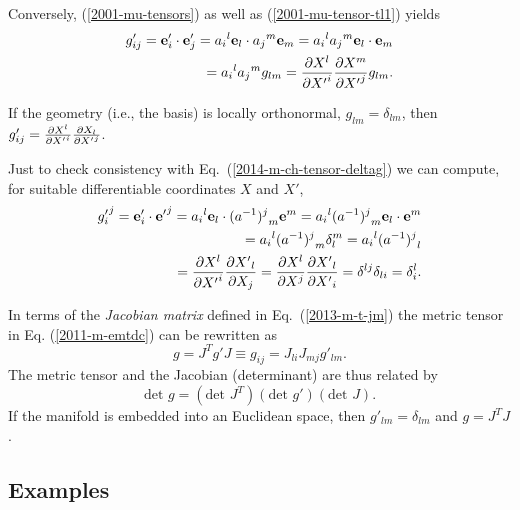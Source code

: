 Conversely,  (\ref{2001-mu-tensors}) as well as    (\ref{2001-mu-tensor-tl1})
yields
\begin{equation}
\begin{split}
g'_{ij}={\bf e}'_i\cdot {\bf e}'_j
={a_i}^l{\bf e}_l\cdot {a_j}^m{\bf e}_m
={a_i}^l {a_j}^m {\bf e}_l\cdot {\bf e}_m  \\
= {a_i}^l {a_j}^m {g}_{lm}
= {\partial {X}^l\over \partial {X'}^i}{\partial {X}^m\over \partial {X'}^j} {g}_{lm}
.
\end{split}
\end{equation}


If the geometry (i.e., the basis) is locally orthonormal, ${g}_{lm}=\delta_{lm}$,
then
$g'_{ij}={\partial {X}^l\over \partial {X'}^i}{\partial {X}_l\over \partial {X'}^j}$.

Just to check consistency with Eq.~(\ref{2014-m-ch-tensor-deltag}) we can compute,
for suitable differentiable coordinates $X$ and $X'$,
\begin{equation}
\begin{split}
{g'_i}^j={\bf e}'_i\cdot {{\bf e}'}^j
={a_i}^l{\bf e}_l\cdot {(a^{-1})^j}_m{\bf e}^m
={a_i}^l {(a^{-1})^j}_m {\bf e}_l\cdot {\bf e}^m  \\
= {a_i}^l {(a^{-1})^j}_m \delta_l^m
= {a_i}^l {(a^{-1})^j}_l  \\
= {\partial {X}^l\over \partial {X'}^i}{\partial {X'}_l\over \partial {X}_j}
= {\partial {X}^l\over \partial {X}^j}{\partial {X'}_l\over \partial {X'}_i}
= \delta^{lj}\delta_{li}
= \delta^l_i
.
\end{split}
\end{equation}

In terms of the
{\em  Jacobian matrix} defined in Eq.~(\ref{2013-m-t-jm})
the metric tensor in Eq. (\ref{2011-m-emtdc})
can be rewritten as
\begin{equation}
g = J^T g' J
\equiv g_{ij}= J_{li}J_{mj}g'_{lm}
.
\label{2011-m-emtdcJ}
\end{equation}
The metric tensor and the Jacobian (determinant)
are thus related by
\begin{equation}
\textrm{det }g = (\textrm{det }J^T) (\textrm{det } g')(\textrm{det } J)
.
\label{2011-m-emtdcJd}
\end{equation}
If the manifold is embedded into an Euclidean space,
then $g'_{lm}=\delta_{lm}$
and  $g = J^T  J $.

\subsection{Examples}

